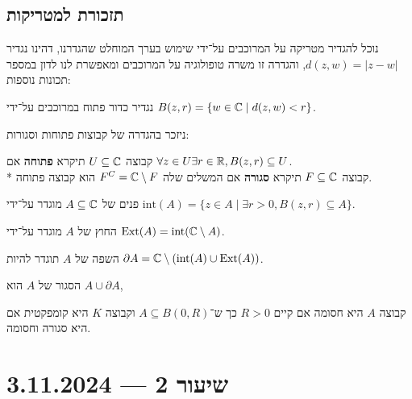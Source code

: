\subsection{תזכורת למטריקות}
נוכל להגדיר מטריקה על המרוכבים על־ידי שימוש בערך המוחלט שהגדרנו, דהינו נגדיר $d(z, w) = |z - w|$, והגדרה זו משרה טופולוגיה על המרוכבים ומאפשרת לנו לדון במספר תכונות נוספות:
\begin{definition}
	נגדיר כדור פתוח במרוכבים על־ידי $B(z, r) = \{ w \in \mathbb{C} \mid d(z, w) < r\}$.
\end{definition}
ניזכר בהגדרה של קבוצות פתוחות וסגורות:
\begin{definition}
	קבוצה $U \subseteq \mathbb{C}$ תיקרא \textbf{פתוחה} אם $\forall z \in U \exists r \in \mathbb{R}, B(z, r) \subseteq U$. \\*
	קבוצה $F \subseteq \mathbb{C}$ תיקרא \textbf{סגורה} אם המשלים שלה $F^C = \mathbb{C} \setminus F$ הוא קבוצה פתוחה.
\end{definition}
\begin{definition}
	פנים של $A \subseteq \mathbb{C}$ מוגדר על־ידי $\text{int}(A) = \{ z \in A \mid \exists r > 0, B(z, r) \subseteq A \}$.
\end{definition}
\begin{definition}
	החוץ של $A$ מוגדר על־ידי $\text{Ext}(A) = \text{int}(\mathbb{C} \setminus A)$.
\end{definition}
\begin{definition}
	השפה של $A$ תוגדר להיות $\partial A = \mathbb{C} \setminus (\text{int}(A) \cup \text{Ext}(A))$.
\end{definition}
\begin{definition}
	הסגור של $A$ הוא $A \cup \partial A$, 
\end{definition}
\begin{definition}
	קבוצה $A$ היא חסומה אם קיים $R > 0$ כך ש־$A \subseteq B(0, R)$ וקבוצה $K$ היא קומפקטית אם היא סגורה וחסומה.
\end{definition}

\section{שיעור 2 --- 3.11.2024}

